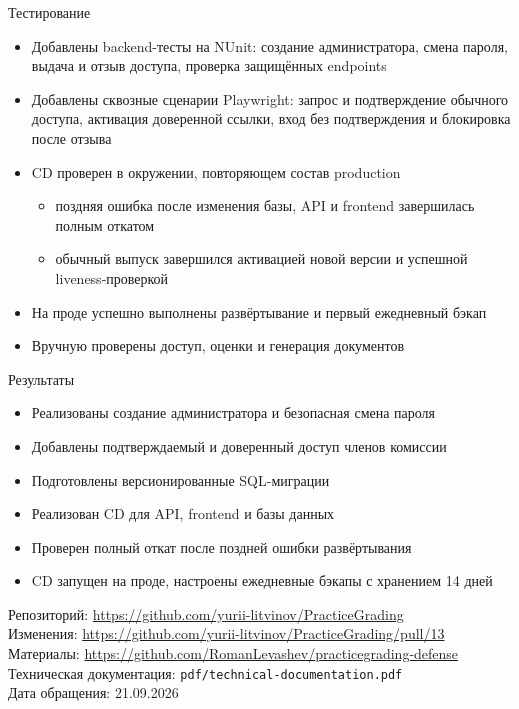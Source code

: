 \documentclass[aspectratio=169]{beamer}
\begin{document}
\begin{frame}{Тестирование}
  \begin{itemize}
    \item Добавлены backend-тесты на NUnit:
      создание администратора, смена пароля, выдача и отзыв доступа,
      проверка защищённых endpoints
    \item Добавлены сквозные сценарии Playwright:
      запрос и подтверждение обычного доступа, активация доверенной ссылки,
      вход без подтверждения и блокировка после отзыва
    \item CD проверен в окружении, повторяющем состав production
      \begin{itemize}
        \item поздняя ошибка после изменения базы, API и frontend
          завершилась полным откатом
        \item обычный выпуск завершился активацией новой версии
          и успешной liveness-проверкой
      \end{itemize}
    \item На проде успешно выполнены развёртывание и первый ежедневный бэкап
    \item Вручную проверены доступ, оценки и генерация документов
  \end{itemize}
\end{frame}

\begin{frame}{Результаты}
  \begin{itemize}
    \item Реализованы создание администратора и безопасная смена пароля
    \item Добавлены подтверждаемый и доверенный доступ членов комиссии
    \item Подготовлены версионированные SQL-миграции
    \item Реализован CD для API, frontend и базы данных
    \item Проверен полный откат после поздней ошибки развёртывания
    \item CD запущен на проде, настроены ежедневные бэкапы с хранением 14 дней
  \end{itemize}

  \vfill
  \tiny
  Репозиторий: \url{https://github.com/yurii-litvinov/PracticeGrading}\\
  Изменения: \url{https://github.com/yurii-litvinov/PracticeGrading/pull/13}\\
  Материалы: \url{https://github.com/RomanLevashev/practicegrading-defense}\\
  Техническая документация: \texttt{pdf/technical-documentation.pdf}\\
  Дата обращения: 21.09.2026
\end{frame}
\end{document}
